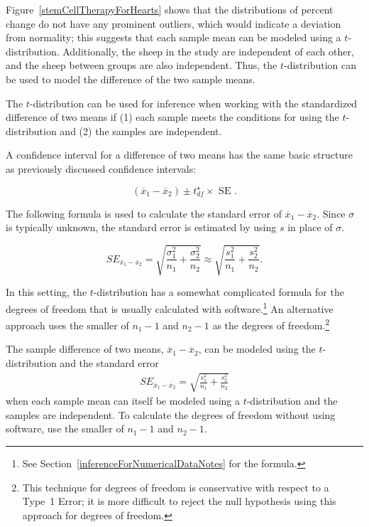 Figure~\ref{stemCellTherapyForHearts} shows that the distributions of percent change do not have any prominent outliers, which would indicate a deviation from normality; this suggests that each sample mean can be modeled using a $t$-distribution. Additionally, the sheep in the study are independent of each other, and the sheep between groups are also independent. Thus, the $t$-distribution can be used to model the difference of the two sample means.

\begin{termBox}{
\label{ConditionsForTwoSampleTDist}The $t$-distribution can be used for inference when working with the standardized difference of two means if (1) each sample meets the conditions for using the $t$-distribution and (2) the samples are independent.}
\end{termBox}


A confidence interval for a difference of two means has the same basic structure as previously discussed confidence intervals:

\[(\overline{x}_{1} - \overline{x}_{2}) \pm t^\star_{df} \times \text{ SE }. \]


The following formula is used to calculate the standard error of $\overline{x}_{1} - \overline{x}_{2}$. Since $\sigma$ is typically unknown, the standard error is estimated by using $s$ in place of $\sigma$. 

\[
SE_{\overline{x}_{1} - \overline{x}_{2}} = \sqrt{\frac{\sigma_{1}^2}{n_{1}} + \frac{\sigma_{2}^2}{n_{2}}} \approx \sqrt{\frac{s_{1}^2}{n_{1}} + \frac{s_{2}^2}{n_{2}}}.
\]

In this setting, the $t$-distribution has a somewhat complicated formula for the degrees of freedom that is usually calculated with software.\footnote{See Section~\ref{inferenceForNumericalDataNotes} for the formula.} An alternative approach uses the smaller of $n_1 - 1$ and $n_2 - 1$ as the degrees of freedom.\footnote{This technique for degrees of freedom is conservative with respect to a Type~1 Error; it is more difficult to reject the null hypothesis using this approach for degrees of freedom.}

\begin{termBox}{
The sample difference of two means, $\overline{x}_1 - \overline{x}_2$, can be modeled using the $t$-distribution and the standard error
\begin{eqnarray}
\textstyle
SE_{\overline{x}_{1} - \overline{x}_{2}} = \sqrt{\frac{s_1^2}{n_1} + \frac{s_2^2}{n_2}}
\label{seOfDifferenceInMeans}
\end{eqnarray}
when each sample mean can itself be modeled using a $t$-distribution and the samples are independent. To calculate the degrees of freedom without using software, use the smaller of $n_1 - 1$ and $n_2 - 1$.}
\end{termBox}%

